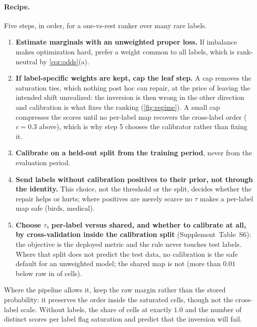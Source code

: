 \documentclass[sigconf,nonacm]{acmart}
\newcommand{\Supp}[1]{Supplement~#1}  %
\begin{document}
\paragraph{Recipe.} Five steps, in order, for a one-vs-rest ranker over many rare labels.
\begin{enumerate}[leftmargin=*,nosep]
\item \textbf{Estimate marginals with an unweighted proper loss.} If imbalance makes optimization hard, prefer a weight common to all labels, which is rank-neutral by \cref{cor:odds}(a).
\item \textbf{If label-specific weights are kept, cap the leaf step.} A cap removes the saturation ties, which nothing post hoc can repair, at the price of leaving the intended shift unrealized: the inversion is then wrong in the other direction and calibration is what fixes the ranking (\cref{fig:regime}). A small cap compresses the scores until no per-label map recovers the cross-label order ($c=0.3$ above), which is why step 5 chooses the calibrator rather than fixing it.
\item \textbf{Calibrate on a held-out split from the training period}, never from the evaluation period.
\item \textbf{Send labels without calibration positives to their prior, not through the identity.} This choice, not the threshold or the split, decides whether the repair helps or hurts; where positives are merely scarce no $\tau$ makes a per-label map safe (birds, medical).
\item \textbf{Choose $\tau$, per-label versus shared, and whether to calibrate at all, by cross-validation inside the calibration split} (\Supp{Table~S6}): the objective is the deployed metric and the rule never touches test labels. Where that split does not predict the test data, no calibration is the safe default for an unweighted model; the shared map is not (more than $0.01$ below raw in \nnSharedBelowRaw{} of \nnTauCells{} cells).
\end{enumerate}
Where the pipeline allows it, keep the raw margin rather than the stored probability: it preserves the order inside the saturated cells, though not the cross-label scale. Without labels, the share of cells at exactly $1.0$ and the number of distinct scores per label flag saturation and predict that the inversion will fail.
\end{document}
